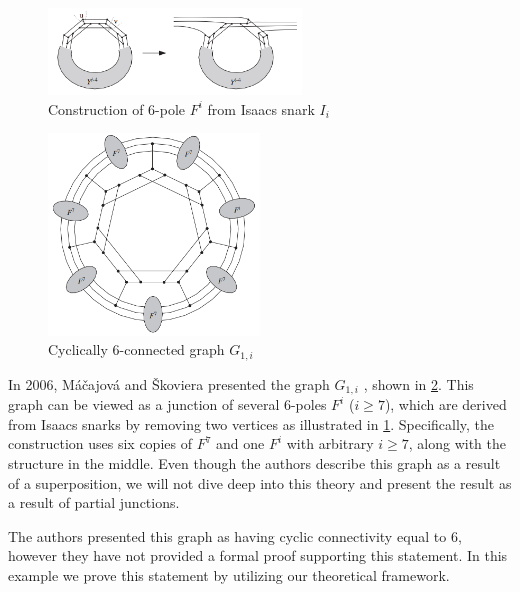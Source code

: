 \documentclass[12pt, twoside]{book}
\begin{document}
\begin{example}
	\begin{figure}
		\centering
		\includegraphics[width=0.6\textwidth]{images/create-Fi-from-Isaacs}
		\caption{\cite{Macajova2006} Construction of 6-pole $F^i$ from Isaacs snark $I_i$}
		\label{fig:construction-fi-from-isaacs}
	\end{figure}

	\begin{figure}
		\centering
		\includegraphics[width=0.5\textwidth]{images/snark-Gi-from-Isaacs}
		\caption{\cite{Macajova2006} Cyclically 6-connected graph $G_{1,i}$}
		\label{fig:cyc-6-graph-Macajova}
	\end{figure}

	In 2006, Máčajová and Škoviera presented the graph $G_{1,i}$ \cite{Macajova2006}, shown in \cref{fig:cyc-6-graph-Macajova}. This graph can be viewed as a junction of several 6-poles $F^i$ ($i\geq 7$), which are derived from Isaacs snarks \cite{Isaacs1975} by removing two vertices as illustrated in \cref{fig:construction-fi-from-isaacs}. Specifically, the construction uses six copies of $F^7$ and one $F^i$ with arbitrary $i\geq 7$, along with the structure in the middle. Even though the authors describe this graph as a result of a superposition, we will not dive deep into this theory and present the result as a result of partial junctions.
	
	The authors presented this graph as having cyclic connectivity equal to 6, however they have not provided a formal proof supporting this statement. In this example we prove this statement by utilizing our theoretical framework.
	

\end{example}
\end{document}

